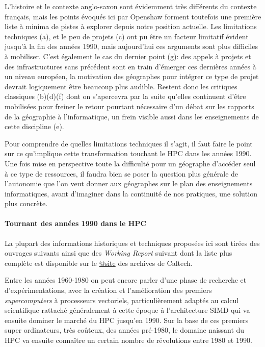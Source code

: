 L'histoire et le contexte anglo-saxon sont évidemment très différents du contexte français, mais les points évoqués ici par Openshaw forment toutefois une première liste à minima de pistes à explorer depuis notre position actuelle. Les limitations techniques (a), et le peu de projets (c) ont pu être un facteur limitatif évident jusqu'à la fin des années 1990, mais aujourd'hui ces arguments sont plus difficiles à mobiliser. C'est également le cas du dernier point (g): des appels à projets et des infrastructures sans précédent sont en train d'émerger ces dernières années à un niveau européen, la motivation des géographes pour intégrer ce type de projet devrait logiquement être beaucoup plus audible. Restent donc les critiques classiques (b)(d)(f) dont on s'apercevra par la suite qu'elles continuent d'être mobilisées pour freiner le retour pourtant nécessaire d'un débat sur les rapports de la géographie à l'informatique, un frein visible aussi dans les enseignements de cette discipline (e).

Pour comprendre de quelles limitations techniques il s'agit, il faut faire le point sur ce qu'implique cette transformation touchant le HPC dans les années 1990. Une fois mise en perspective toute la difficulté pour un géographe d'accéder seul à ce type de ressources, il faudra bien se poser la question plus générale de l'autonomie que l'on veut donner aux géographes sur le plan des enseignements informatiques, avant d'imaginer dans la continuité de nos pratiques, une solution plus concrète.

\paragraph{Tournant des années 1990 dans le HPC}
\label{p:Tournant1980}

La plupart des informations historiques et techniques proposées ici sont tirées des ouvrages suivants \autocites{Fox1994, Fox1988, Seitz1985, CM2-1990, Lerman1993, Padua2011, Dietrich1984}[81-84]{Culler1998, Steele2011} ainsi que des \textit{Working Report} suivant \autocites{Athas1987, Su1987, Seitz1983, Seitz1984a, Seitz1984b} dont la liste plus complète est disponible sur le \href{http://authors.library.caltech.edu/view/person-az/Seitz-C-L.html}{@site} des archives de Caltech.

Entre les années 1960-1980 on peut encore parler d'une phase de recherche et d'expérimentations, avec la création et l'amélioration des premiers \textit{supercomputers} à processeurs vectoriels, particulièrement adaptés au calcul scientifique rattaché généralement à cette époque à l'architecture SIMD qui va ensuite dominer le marché du HPC jusqu'en 1990. Sur la base de ces premiers super ordinateurs, très coûteux, des années pré-1980, le domaine naissant du HPC va ensuite connaître un certain nombre de révolutions entre 1980 et 1990.

